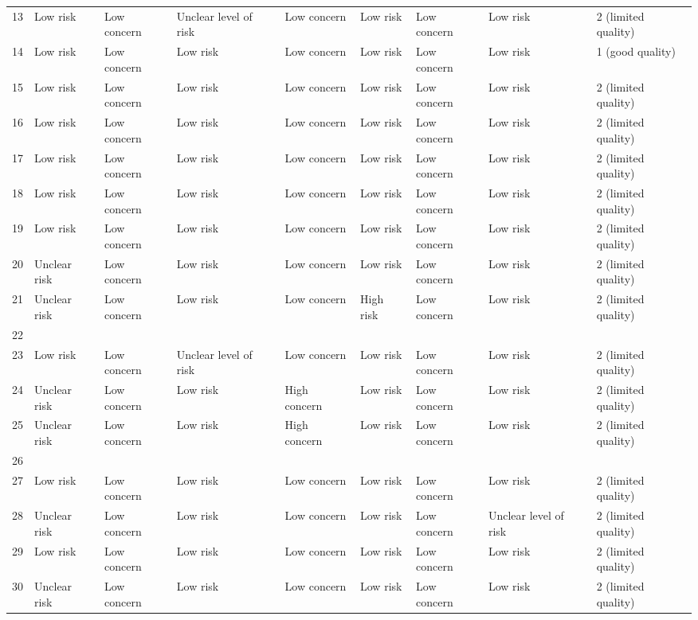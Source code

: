 \begin{table}[ht]
\begin{tabular}{rllllllll}
  13 & Low risk & Low concern & Unclear level of risk & Low concern & Low risk & Low concern & Low risk & 2 (limited quality) \\ 
  14 & Low risk & Low concern & Low risk & Low concern & Low risk & Low concern & Low risk & 1 (good quality) \\ 
  15 & Low risk & Low concern & Low risk & Low concern & Low risk & Low concern & Low risk & 2 (limited quality) \\ 
  16 & Low risk & Low concern & Low risk & Low concern & Low risk & Low concern & Low risk & 2 (limited quality) \\ 
  17 & Low risk & Low concern & Low risk & Low concern & Low risk & Low concern & Low risk & 2 (limited quality) \\ 
  18 & Low risk & Low concern & Low risk & Low concern & Low risk & Low concern & Low risk & 2 (limited quality) \\ 
  19 & Low risk & Low concern & Low risk & Low concern & Low risk & Low concern & Low risk & 2 (limited quality) \\ 
  20 & Unclear risk & Low concern & Low risk & Low concern & Low risk & Low concern & Low risk & 2 (limited quality) \\ 
  21 & Unclear risk & Low concern & Low risk & Low concern & High risk & Low concern & Low risk & 2 (limited quality) \\ 
  22 &  &  &  &  &  &  &  &  \\ 
  23 & Low risk & Low concern & Unclear level of risk & Low concern & Low risk & Low concern & Low risk & 2 (limited quality) \\ 
  24 & Unclear risk & Low concern & Low risk & High concern & Low risk & Low concern & Low risk & 2 (limited quality) \\ 
  25 & Unclear risk & Low concern & Low risk & High concern & Low risk & Low concern & Low risk & 2 (limited quality) \\ 
  26 &  &  &  &  &  &  &  &  \\ 
  27 & Low risk & Low concern & Low risk & Low concern & Low risk & Low concern & Low risk & 2 (limited quality) \\ 
  28 & Unclear risk & Low concern & Low risk & Low concern & Low risk & Low concern & Unclear level of risk & 2 (limited quality) \\ 
  29 & Low risk & Low concern & Low risk & Low concern & Low risk & Low concern & Low risk & 2 (limited quality) \\ 
  30 & Unclear risk & Low concern & Low risk & Low concern & Low risk & Low concern & Low risk & 2 (limited quality) \\ 

\end{tabular}
\end{table}
